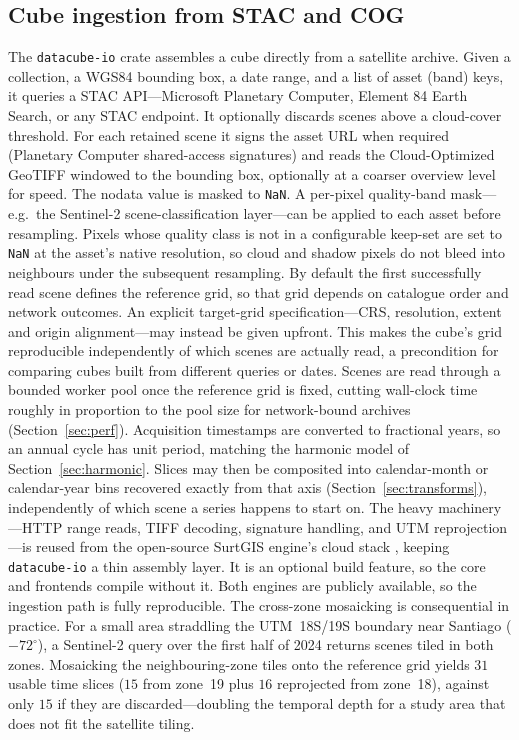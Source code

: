 \documentclass[review]{elsarticle}
\begin{document}
\subsection{Cube ingestion from STAC and COG}
\label{sec:ingest}
The \texttt{datacube-io} crate assembles a cube directly from a satellite
archive. Given a collection, a WGS84 bounding box, a date range, and a list of
asset (band) keys, it queries a STAC API---Microsoft Planetary Computer,
Element 84 Earth Search, or any STAC endpoint. It optionally discards scenes
above a cloud-cover threshold. For each retained scene it signs the asset URL
when required (Planetary Computer shared-access signatures) and reads the
Cloud-Optimized GeoTIFF windowed to the bounding box, optionally at a coarser
overview level for speed. The nodata value is masked to \texttt{NaN}. A
per-pixel quality-band mask---e.g.\ the Sentinel-2 scene-classification
layer---can be applied to each asset before resampling. Pixels whose quality
class is not in a configurable keep-set are set to \texttt{NaN} at the
asset's native resolution, so cloud and shadow pixels do not bleed into
neighbours under the subsequent resampling. By default the first
successfully read scene defines the reference grid, so that grid depends on
catalogue order and network outcomes. An explicit target-grid
specification---CRS, resolution, extent and origin alignment---may instead be
given upfront. This makes the cube's grid reproducible independently of which
scenes are actually read, a precondition for comparing cubes built from
different queries or dates. Scenes are read through a bounded worker pool
once the reference grid is fixed, cutting wall-clock time roughly in
proportion to the pool size for network-bound archives
(Section~\ref{sec:perf}). Acquisition timestamps are converted to fractional
years, so an annual cycle has unit period, matching the harmonic model of
Section~\ref{sec:harmonic}. Slices may then be composited into
calendar-month or calendar-year bins recovered exactly from that axis
(Section~\ref{sec:transforms}), independently of which scene a series
happens to start on. The heavy machinery---HTTP range reads, TIFF decoding,
signature handling, and UTM reprojection---is reused from the open-source
SurtGIS engine's cloud stack \citep{surtgis}, keeping \texttt{datacube-io} a
thin assembly layer. It is an optional build feature, so the core and
frontends compile without it. Both engines are publicly available, so the
ingestion path is fully reproducible. The cross-zone mosaicking is
consequential in practice. For a small area straddling the UTM~18S/19S
boundary near Santiago ($-72^\circ$), a Sentinel-2 query over the first half
of 2024 returns scenes tiled in both zones. Mosaicking the neighbouring-zone
tiles onto the reference grid yields $31$ usable time slices ($15$ from
zone~19 plus $16$ reprojected from zone~18), against only $15$ if they are
discarded---doubling the temporal depth for a study area that does not fit
the satellite tiling.
\end{document}

